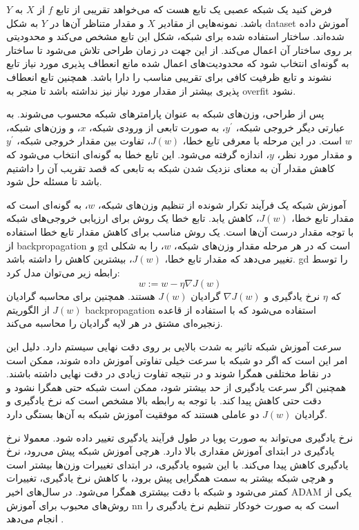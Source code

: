 فرض کنید یک شبکه عصبی یک تابع هست که می‌خواهد تقریبی از تابع $f$ از $X$ به $Y$
باشد. نمونه‌هایی از مقادیر $X$ و مقدار متناظر آن‌ها در $Y$ به شکل \gls{dataset}
آموزش داده شده‌اند. ساختار استفاده شده برای شبکه، شکل این تابع مشخص می‌کند و
محدودیتی بر روی ساختار آن اعمال می‌کند. از این جهت در زمان طراحی تلاش می‌شود تا
ساختار به گونه‌ای انتخاب شود که محدودیت‌های اعمال شده مانع انعطاف پذیری مورد
نیاز تابع نشوند و تابع ظرفیت کافی برای تقریبی مناسب را دارا باشد. همچنین تابع
انعطاف پذیری بیشتر از مقدار مورد نیاز نیز نداشته باشد تا منجر به \gls{overfit}
نشود.

پس از طراحی، وزن‌های شبکه به عنوان پارامترهای شبکه محسوب می‌شوند. به عبارتی دیگر
خروجی شبکه، $y^\prime$، به صورت تابعی از ورودی شبکه، $x$، و وزن‌های شبکه، $w$
است. در این مرحله با معرفی تابع خطا، $J(w)$، تفاوت بین مقدار خروجی شبکه،
$y^\prime$ و مقدار مورد نظر، $y$، اندازه گرفته می‌شود. این تابع خطا به گونه‌ای
انتخاب می‌شود که کاهش مقدار آن به معنای نزدیک شدن شبکه به تابعی که قصد تقریب آن
را داشتیم باشد تا مسئله حل شود.

آموزش شبکه یک فرآیند تکرار شونده از تنظیم وزن‌های شبکه، $w$، به گونه‌ای است که
مقدار تابع خطا، $J(w)$، کاهش یابد. تابع خطا یک روش برای ارزیابی خروجی‌های شبکه
با توجه مقدار درست آن‌ها است. یک روش مناسب برای کاهش مقدار تابع خطا استفاده از
\gls{backpropagation} و \gls{gd} است که در هر مرحله مقدار وزن‌های شبکه، $w$، را
به شکلی تغییر می‌دهد که مقدار تابع خطا، $J(w)$، بیشترین کاهش را داشته باشد.
\gls{gd} را توسط رابطه زیر می‌توان مدل کرد:
\begin{equation}
    w := w - \eta \nabla J(w)
\end{equation}
که $\eta$ نرخ یادگیری و $\nabla J(w)$ گرادیان $J(w)$ هستند. همچنین برای محاسبه
گرادیان $J(w)$ از الگوریتم \gls{backpropagation} استفاده می‌شود که با استفاده از
قاعده زنجیره‌ای مشتق در هر لایه گرادیان را محاسبه می‌کند.

سرعت آموزش شبکه تاثیر به شدت بالایی بر روی دقت نهایی سیستم دارد. دلیل این امر
این است که اگر دو شبکه با سرعت خیلی تفاوتی آموزش داده شوند، ممکن است در نقاط
مختلفی همگرا شوند و در نتیجه تفاوت زیادی در دقت نهایی داشته باشند. همچنین اگر
سرعت یادگیری از حد بیشتر شود، ممکن است شبکه حتی همگرا نشود و دقت حتی کاهش پیدا
کند. با توجه به رابطه بالا مشخص است که نرخ یادگیری و گرادیان $J(w)$ دو عاملی
هستند که موفقیت آموزش شبکه به آن‌ها بستگی دارد.

نرخ یادگیری می‌تواند به صورت پویا در طول فرآیند یادگیری تغییر داده شود. معمولا
نرخ یادگیری در ابتدای آموزش مقداری بالا دارد. هرچی آموزش شبکه پیش می‌رود، نرخ
یادگیری کاهش پیدا می‌کند. با این شیوه یادگیری، در ابتدای تغییرات وزن‌ها بیشتر
است و هرچی شبکه بیشتر به سمت همگرایی پیش برود، با کاهش نرخ یادگیری، تغییرات کمتر
می‌شود و شبکه با دقت بیشتری همگرا می‌شود. در سال‌های اخیر ADAM یکی از روش‌های
محبوب برای آموزش \gls{nn} است که به صورت خودکار تنظیم نرخ یادگیری را انجام
می‌دهد \cite{kingma2014adam}.

